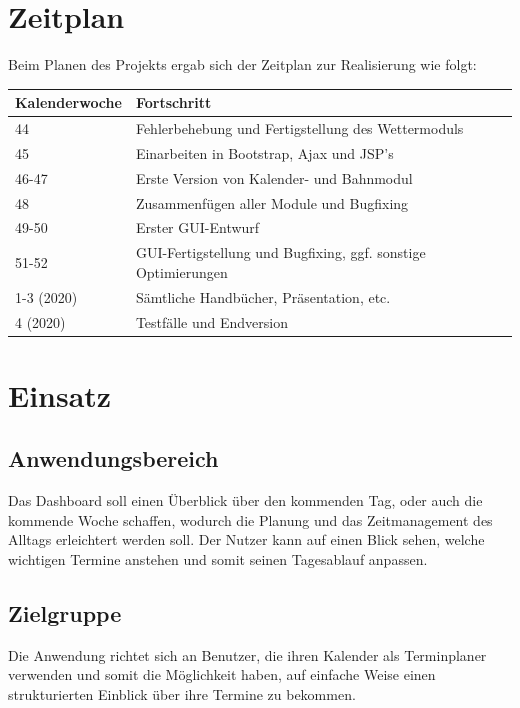 \documentclass[12pt]{article}
\begin{document}
\section{Zeitplan}
Beim Planen des Projekts ergab sich der Zeitplan zur Realisierung wie folgt:\\
\newline
\begin{tabular}{|l|l|}
\hline
\textbf{Kalenderwoche} & \textbf{Fortschritt}\\
\hline
44 & Fehlerbehebung und Fertigstellung des Wettermoduls\\
\hline
45 & Einarbeiten in Bootstrap, Ajax und JSP's\\
\hline
46-47 & Erste Version von Kalender- und Bahnmodul\\
\hline
48 & Zusammenfügen aller Module und Bugfixing\\
\hline
49-50 & Erster GUI-Entwurf\\
\hline
51-52 & GUI-Fertigstellung und Bugfixing, ggf. sonstige Optimierungen\\
\hline
1-3  (2020) & Sämtliche Handbücher, Präsentation, etc.\\
\hline
4  (2020)& Testfälle und Endversion\\
\hline
\end{tabular}
\section{Einsatz}
\subsection*{Anwendungsbereich}
Das Dashboard soll einen Überblick über den kommenden Tag, oder auch die kommende Woche schaffen, wodurch die Planung und das Zeitmanagement des Alltags erleichtert werden soll. Der Nutzer kann auf einen Blick sehen, welche wichtigen Termine anstehen und somit seinen Tagesablauf anpassen.
\subsection*{Zielgruppe}
Die Anwendung richtet sich an Benutzer, die ihren Kalender als Terminplaner verwenden und somit die Möglichkeit haben, auf einfache Weise einen strukturierten Einblick über ihre Termine zu bekommen.
\end{document}
